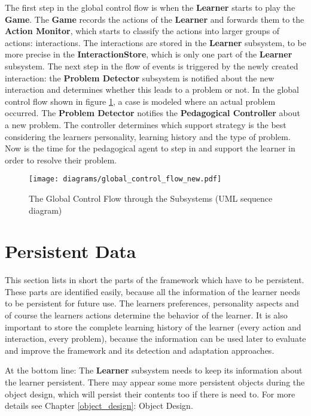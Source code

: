 The first step in the global control flow is when the \textbf{Learner} starts
to play the \textbf{Game}. The \textbf{Game} records the actions of the
\textbf{Learner} and forwards them to the \textbf{Action Monitor}, which
starts to classify the actions into larger groups of actions: interactions. The
interactions are stored in the \textbf{Learner} subsystem, to be more precise in the
\textbf{InteractionStore}, which is only one part of the \textbf{Learner}
subsystem. The next step in the flow of events is triggered by the newly
created interaction: the \textbf{Problem Detector} subsystem is notified
about the new interaction and determines whether this leads to a problem or
not. In the global control flow shown in figure \ref{control_flow}, a case is
modeled where an actual problem occurred. The \textbf{Problem Detector} notifies
the \textbf{Pedagogical Controller} about a new problem. The controller
determines which support strategy is the best considering the learners
personality, learning history and the type of problem. Now is the time for the
pedagogical agent to step in and support the learner in order to resolve their
problem.

\begin{figure}
    \centering
    \texttt{[image: diagrams/global\_control\_flow\_new.pdf]}
    \caption[The Global Control Flow through the Subsystems (UML sequence diagram)]
    {The Global Control Flow through the Subsystems (UML sequence diagram)}
    \label{control_flow}
\end{figure}

\section{Persistent Data}
This section lists in short the parts of the framework which have to be
persistent. These parts are identified easily, because all the information of
the learner needs to be persistent for future use. The learners preferences,
personality aspects and of course the learners actions determine the behavior
of the learner. It is also important to store the complete
learning history of the learner (every action and interaction, every problem),
because the information can be used later to evaluate and improve the
framework and its detection and adaptation approaches.

At the bottom line: The \textbf{Learner} subsystem needs to keep its
information about the learner persistent. There may appear some more
persistent objects during the object design, which will persist their contents
too if there is need to. For more details see Chapter \ref{object_design}:
Object Design.
